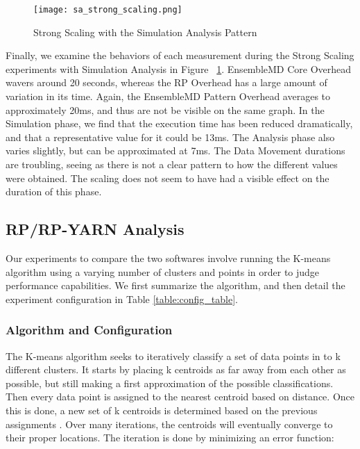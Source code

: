 \documentclass[]{article}
\begin{document}
			\begin{figure}[H]
				\centering
				\texttt{[image: sa\_strong\_scaling.png]}
				\caption{Strong Scaling with the Simulation Analysis Pattern}
				\label{fig:sa_strong_scaling}
			\end{figure}
			
			Finally, we examine the behaviors of each measurement during the Strong Scaling experiments with Simulation Analysis in Figure ~\ref{fig:sa_strong_scaling}. EnsembleMD Core Overhead wavers around 20 seconds, whereas the RP Overhead has a large amount of variation in its time. Again, the EnsembleMD Pattern Overhead averages to approximately 20ms, and thus are not be visible on the same graph.
			In the Simulation phase, we find that the execution time has been reduced dramatically, and that a representative value for it could be 13ms. The Analysis phase also varies slightly, but can be approximated at 7ms.
			The Data Movement durations are troubling, seeing as there is not a clear pattern to how the different values were obtained. The scaling does not seem to have had a visible effect on the duration of this phase.

	\subsection{RP/RP-YARN Analysis}
		Our experiments to compare the two softwares involve running the K-means algorithm using a varying number of clusters and points in order to judge performance capabilities. We first summarize the algorithm, and then detail the experiment configuration in Table \ref{table:config_table}.

		\subsubsection{Algorithm and Configuration}
			The K-means algorithm seeks to iteratively classify a set of data points in to k different clusters. It starts by placing k centroids as far away from each other as possible, but still making a first approximation of the possible classifications. Then every data point is assigned to the nearest centroid based on distance. Once this is done, a new set of k centroids is determined based on the previous assignments \cite{k_means}. Over many iterations, the centroids will eventually converge to their proper locations. The iteration is done by minimizing an error function:
\end{document}

